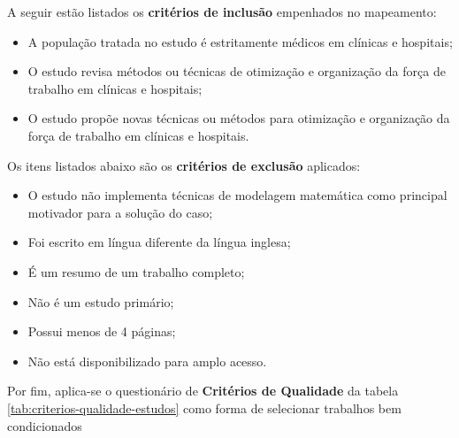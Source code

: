 \documentclass[article,12pt,oneside]{article}
\begin{document}
A seguir estão listados os \textbf{critérios de inclusão} empenhados no mapeamento:
\begin{itemize}
	\item A população tratada no estudo é estritamente médicos em clínicas e hospitais;
	\item O estudo revisa métodos ou técnicas de otimização e organização da força de trabalho em clínicas e hospitais;
	\item O estudo propõe novas técnicas ou métodos para otimização e organização da força de trabalho em clínicas e hospitais.
\end{itemize}
Os itens listados abaixo são os \textbf{critérios de exclusão} aplicados:
\begin{itemize}
	\item O estudo não implementa técnicas de modelagem matemática como principal motivador para a solução do caso;
	\item Foi escrito em língua diferente da língua inglesa;
	\item É um resumo de um trabalho completo;
	\item Não é um estudo primário;
	\item Possui menos de 4 páginas;
	\item Não está disponibilizado para amplo acesso.
\end{itemize}

\newpage

Por fim, aplica-se o questionário de \textbf{Critérios de Qualidade} da tabela \ref{tab:criterios-qualidade-estudos} como forma de selecionar trabalhos bem condicionados
\end{document}
